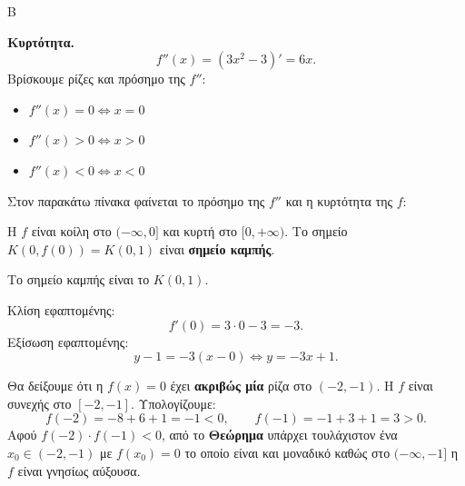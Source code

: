 \begin{thema}{Β}
\begin{erwthma}
\textbf{Κυρτότητα.}
\[
f''(x) =(3x^2-3)'= 6x.
\]
Βρίσκουμε ρίζες και πρόσημο της $f''$:
\begin{itemize}
    \item $f''(x) = 0 \Leftrightarrow x = 0$
    \item $f''(x) > 0 \Leftrightarrow x > 0$
    \item $f''(x) < 0 \Leftrightarrow x < 0$
\end{itemize}
Στον παρακάτω πίνακα φαίνεται το πρόσημο της $f''$ και η κυρτότητα της $f$:
\begin{center}
\end{center}
Η $f$ είναι κοίλη στο $(-\infty,0]$ και κυρτή στο $[0,+\infty)$.
Το σημείο $K(0, f(0)) = K(0,1)$ είναι \textbf{σημείο καμπής}.

\item Το σημείο καμπής είναι το $K(0, 1)$.

Κλίση εφαπτομένης:
\[
f'(0) = 3\cdot0 - 3 = -3.
\]
Εξίσωση εφαπτομένης:
\[
y - 1 = -3(x - 0) \Leftrightarrow y = -3x + 1.
\]

\item Θα δείξουμε ότι η $f(x) = 0$ έχει \textbf{ακριβώς μία} ρίζα στο $(-2,-1)$. Η $f$ είναι συνεχής στο $[-2,-1]$. Υπολογίζουμε:
\[
f(-2) = -8 + 6 + 1 = -1 < 0,\qquad f(-1) = -1 + 3 + 1 = 3 > 0.
\]
Αφού $f(-2)\cdot f(-1) < 0$, από το \textbf{Θεώρημα } υπάρχει τουλάχιστον ένα $x_0 \in (-2,-1)$ με $f(x_0) = 0$ το οποίο είναι και μοναδικό καθώς
στο $(-\infty,-1]$ η $f$ είναι γνησίως αύξουσα.
\end{erwthma}
\end{thema}

